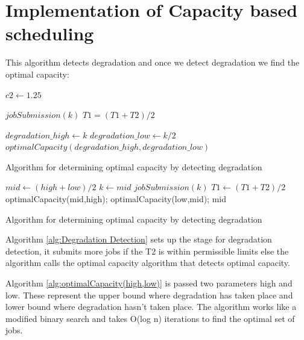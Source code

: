 \documentclass[ms,electronic,double]{nuthesis}
\begin{document}
\section{Implementation of Capacity based scheduling}

This algorithm detects degradation and once we detect degradation we find the 
optimal capacity:

\begin{algorithm}
\begin{algorithmic}
\STATE $c2 \gets 1.25$ 

  \STATE $jobSubmission(k)$ 
  \STATE $T1=(T1+T2)/2$
\ENDIF

  \STATE $degradation\_high \gets k$
  \STATE $degradation\_low \gets k/2$
  \STATE $optimalCapacity(degradation\_high,degradation\_low)$
\ENDIF

\ENDWHILE

\end{algorithmic}
\caption{Algorithm for determining optimal capacity by detecting degradation}
\label{alg:Degradation Detection}
\end{algorithm}


\begin{algorithm}
\begin{algorithmic}

\STATE $mid \gets (high+low)/2$ 
\STATE $k \gets mid$
\STATE $jobSubmission(k)$ 
\STATE $T1 \gets (T1+T2)/2$
\STATE optimalCapacity(mid,high);
\ENDIF  
{}
\STATE optimalCapacity(low,mid);
\ENDIF
\RETURN mid
\end{algorithmic}
\caption{Algorithm for determining optimal capacity by detecting degradation}
\label{alg:optimalCapacity(high,low)}
\end{algorithm}

Algorithm \ref{alg:Degradation Detection} sets up the stage for degradation 
detection, it submits more jobs if the T2 is within permissible limits else the 
algorithm calls the optimal capacity algorithm that detects optimal capacity.

Algorithm \ref{alg:optimalCapacity(high,low)} is passed two parameters high and 
low. These represent the upper bound where degradation has taken place and lower bound 
where degradation hasn't taken place. The algorithm works like a modified binary 
search and takes O(log n) iterations to find the optimal set of jobs.
\end{document}

